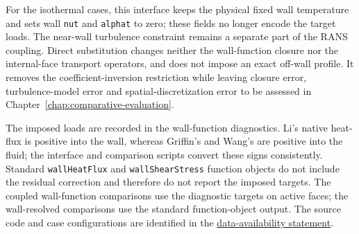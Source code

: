 For the isothermal cases, this interface keeps the physical fixed wall temperature and sets wall \texttt{nut} and \texttt{alphat} to zero; these fields no longer encode the target loads. The near-wall turbulence constraint remains a separate part of the RANS coupling. Direct substitution changes neither the wall-function closure nor the internal-face transport operators, and does not impose an exact off-wall profile. It removes the coefficient-inversion restriction while leaving closure error, turbulence-model error and spatial-discretization error to be assessed in Chapter~\ref{chap:comparative-evaluation}.

The imposed loads are recorded in the wall-function diagnostics. Li's native heat-flux is positive into the wall, whereas Griffin's and Wang's are positive into the fluid; the interface and comparison scripts convert these signs consistently. Standard \texttt{wallHeatFlux} and \texttt{wallShearStress} function objects do not include the residual correction and therefore do not report the imposed targets. The coupled wall-function comparisons use the diagnostic targets on active faces; the wall-resolved comparisons use the standard function-object output. The source code and case configurations are identified in the \hyperref[chap:data-avail]{data-availability statement}.
